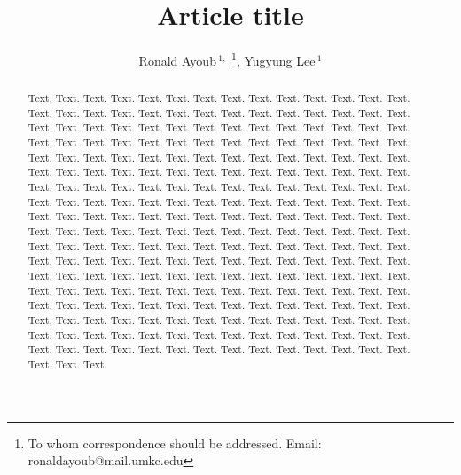 \documentclass[a4,center,fleqn]{NAR}
\begin{document}
\title{Article title}

\author{%
Ronald Ayoub\,$^{1,}$%
\footnote{To whom correspondence should be addressed.
Email: ronaldayoub@mail.umkc.edu},
Yugyung Lee\,$^{1}$}

\address{%
$^{1}$
School of Computing and Engineering, 
University of Missouri at Kansas City,
5110 Rockhill Road,
Kansas City, MO 64110, USA}



\maketitle

\begin{abstract}
Text. Text. Text. Text. Text. Text. Text. Text. Text. Text. Text.
Text. Text. Text. Text. Text. Text. Text. Text. Text. Text. Text.
Text. Text. Text. Text. Text. Text. Text. Text. Text. Text. Text.
Text. Text. Text. Text. Text. Text. Text. Text. Text. Text. Text.
Text. Text. Text. Text. Text. Text. Text. Text. Text. Text. Text.
Text. Text. Text. Text. Text. Text. Text. Text. Text. Text. Text.
Text. Text. Text. Text. Text. Text. Text. Text. Text. Text. Text.
Text. Text. Text. Text. Text. Text. Text. Text. Text. Text. Text.
Text. Text. Text. Text. Text. Text. Text. Text. Text. Text. Text.
Text. Text. Text. Text. Text. Text. Text. Text. Text. Text. Text.
Text. Text. Text. Text. Text. Text. Text. Text. Text. Text. Text.
Text. Text. Text. Text. Text. Text. Text. Text. Text. Text. Text.
Text. Text. Text. Text. Text. Text. Text. Text. Text. Text. Text.
Text. Text. Text. Text. Text. Text. Text. Text. Text. Text. Text.
Text. Text. Text. Text. Text. Text. Text. Text. Text. Text. Text.
Text. Text. Text. Text. Text. Text. Text. Text. Text. Text. Text.
Text. Text. Text. Text. Text. Text. Text. Text. Text. Text. Text.
Text. Text. Text. Text. Text. Text. Text. Text. Text. Text. Text.
Text. Text. Text. Text. Text. Text. Text. Text. Text. Text. Text.
Text. Text. Text. Text. Text. Text. Text. Text. Text. Text. Text.
Text. Text. Text. Text. Text. Text. Text. Text. Text. Text. Text.
Text. Text. Text. Text. Text. Text. Text. Text. Text. Text. Text.
Text. Text. Text. Text. Text. Text. Text. Text. Text. Text. Text.
Text. Text.
\end{abstract}
\end{document}
